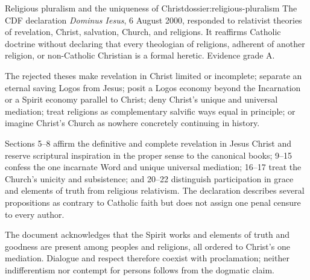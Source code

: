 \begin{heresydossier}{Religious pluralism and the uniqueness of Christ}{dossier:religious-pluralism}
\objectfield The CDF declaration \emph{Dominus Iesus}, 6 August 2000, responded to relativist theories of revelation, Christ, salvation, Church, and religions. It reaffirms Catholic doctrine without declaring that every theologian of religions, adherent of another religion, or non-Catholic Christian is a formal heretic. Evidence grade A.

\propositionfield The rejected theses make revelation in Christ limited or incomplete; separate an eternal saving Logos from Jesus; posit a Logos economy beyond the Incarnation or a Spirit economy parallel to Christ; deny Christ's unique and universal mediation; treat religions as complementary salvific ways equal in principle; or imagine Christ's Church as nowhere concretely continuing in history.

\responsefield Sections 5--8 affirm the definitive and complete revelation in Jesus Christ and reserve scriptural inspiration in the proper sense to the canonical books; 9--15 confess the one incarnate Word and unique universal mediation; 16--17 treat the Church's unicity and subsistence; and 20--22 distinguish participation in grace and elements of truth from religious relativism. The declaration describes several propositions as contrary to Catholic faith but does not assign one penal censure to every author.

\aftermathfield The document acknowledges that the Spirit works and elements of truth and goodness are present among peoples and religions, all ordered to Christ's one mediation. Dialogue and respect therefore coexist with proclamation; neither indifferentism nor contempt for persons follows from the dogmatic claim.
\end{heresydossier}

